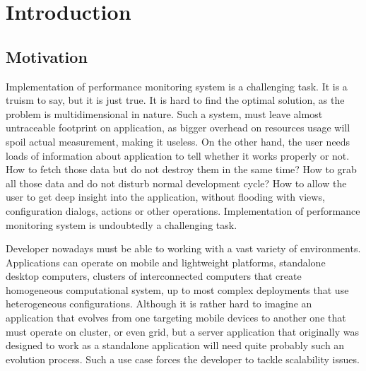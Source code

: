 %
\chapter{Introduction}
\label{cha:intro}



\section{Motivation}
\label{ch1:Motivation}

Implementation of performance monitoring system is a challenging task. It is a truism to say, but it is just true. It is hard to find the optimal solution, as the problem is multidimensional in nature. Such a system, must leave almost untraceable footprint on application, as bigger overhead on resources usage will spoil actual measurement, making it useless. On the other hand, the user needs loads of information about application to tell whether it works properly or not. How to fetch those data but do not destroy them in the same time? How to grab all those data and do not disturb normal development cycle? How to allow the user to get deep insight into the application, without flooding with views, configuration dialogs, actions or other operations. Implementation of performance monitoring system is undoubtedly a challenging task.

Developer nowadays must be able to working with a vast variety of environments. Applications can operate on mobile and lightweight platforms, standalone desktop computers, clusters of interconnected computers that create homogeneous computational system, up to most complex deployments that use heterogeneous configurations. Although it is rather hard to imagine an application that evolves from one targeting mobile devices to another one that must operate on cluster, or even grid, but a server application that originally was designed to work as a standalone application will need quite probably such an evolution process. Such a use case forces the developer to tackle scalability issues.

